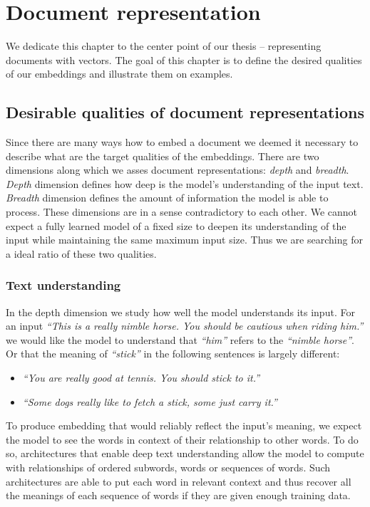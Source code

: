 \chapter{Document representation}

We dedicate this chapter to the center point of our thesis --
representing documents with vectors. The goal of this chapter is to define the
desired qualities of our embeddings and illustrate them on examples.

\section{Desirable qualities of document representations}

Since there are many ways how to embed a document we deemed it necessary to
describe what are the target qualities of the embeddings. There are two
dimensions along which we asses document representations: \emph{depth} and
\emph{breadth}. \emph{Depth} dimension defines how deep is the model's
understanding of the input text. \emph{Breadth} dimension defines the amount of
information the model is able to process. These dimensions are in a sense
contradictory to each other. We cannot expect a fully learned model of a fixed
size to deepen its understanding of the input while maintaining the same
maximum input size. Thus we are searching for a ideal ratio of these two
qualities.

\subsection{Text understanding}

In the depth dimension we study how well the model understands its input. For
an input \emph{``This is a really nimble horse. You should be cautious when
riding him.''} we would like the model to understand that \emph{``him''} refers to
the \emph{``nimble horse''}. Or that the meaning of \emph{``stick''} in the
following sentences is largely different:

\begin{itemize}
  \item \emph{``You are really good at tennis. You should stick to it.''}
  \item \emph{``Some dogs really like to fetch a stick, some just carry it.''}
\end{itemize}

To produce embedding that would reliably reflect the input's meaning, we expect
the model to see the words in context of their relationship to other words. To
do so, architectures that enable deep text understanding allow the model to
compute with relationships of ordered subwords, words or sequences of words.
Such architectures are able to put each word in relevant context and thus
recover all the meanings of each sequence of words if they are given enough
training data.


